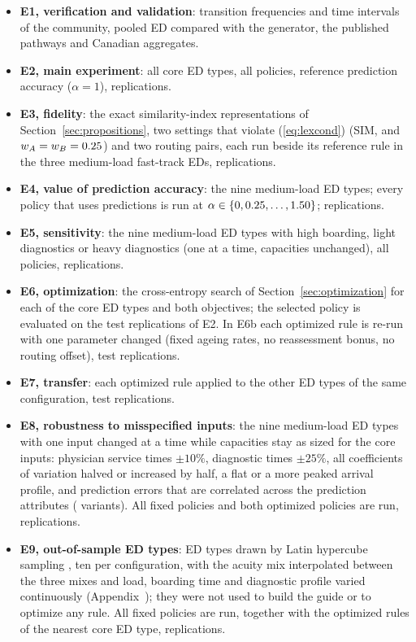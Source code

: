 \begin{itemize}
\item \textbf{E1, verification and validation}: transition frequencies and time intervals of the community, pooled ED compared with the generator, the published pathways and Canadian aggregates.
\item \textbf{E2, main experiment}: all \NEdTypes{} core ED types, all policies, reference prediction accuracy ($\alpha=1$), \Reps{} replications.
\item \textbf{E3, fidelity}: the exact similarity-index representations of Section~\ref{sec:propositions}, two settings that violate (\ref{eq:lexcond}) (SIM, and $w_A=w_B=0.25$) and two routing pairs, each run beside its reference rule in the three medium-load fast-track EDs, \RepsSecondary{} replications.
\item \textbf{E4, value of prediction accuracy}: the nine medium-load ED types; every policy that uses predictions is run at $\alpha\in\{0,0.25,\dots,1.50\}$; \RepsSecondary{} replications.
\item \textbf{E5, sensitivity}: the nine medium-load ED types with high boarding, light diagnostics or heavy diagnostics (one at a time, capacities unchanged), all policies, \RepsSecondary{} replications.
\item \textbf{E6, optimization}: the cross-entropy search of Section~\ref{sec:optimization} for each of the \NEdTypes{} core ED types and both objectives; the selected policy is evaluated on the \Reps{} test replications of E2. In E6b each optimized rule is re-run with one parameter changed (fixed ageing rates, no reassessment bonus, no routing offset), \NLeverReps{} test replications.
\item \textbf{E7, transfer}: each optimized rule applied to the other ED types of the same configuration, \NTransferReps{} test replications.
\item \textbf{E8, robustness to misspecified inputs}: the nine medium-load ED types with one input changed at a time while capacities stay as sized for the core inputs: physician service times $\pm10\%$, diagnostic times $\pm25\%$, all coefficients of variation halved or increased by half, a flat or a more peaked arrival profile, and prediction errors that are correlated across the prediction attributes (\NRobVariants{} variants). All fixed policies and both optimized policies are run, \NRobReps{} replications.
\item \textbf{E9, out-of-sample ED types}: \NOosTypes{} ED types drawn by Latin hypercube sampling \cite{McKay1979_LHS}, ten per configuration, with the acuity mix interpolated between the three mixes and load, boarding time and diagnostic profile varied continuously (Appendix~); they were not used to build the guide or to optimize any rule. All fixed policies are run, together with the optimized rules of the nearest core ED type, \NOosReps{} replications.
\end{itemize}

